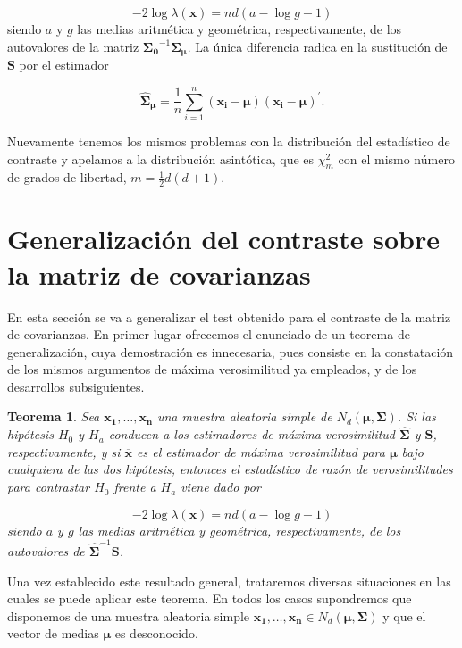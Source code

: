 \documentclass[
  a4paper,
  oneside]{scrbook}
\newtheorem{theorem}{Teorema}[chapter]
\theoremstyle{definition}
\theoremstyle{definition}
\theoremstyle{definition}
\theoremstyle{definition}
\theoremstyle{remark}
\begin{document}
\[-2\log \lambda(\bm{x}) = nd \left(a-\log g -1\right)\] siendo \(a\) y
\(g\) las medias aritmética y geométrica, respectivamente, de los
autovalores de la matriz \(\bm{\Sigma_0}^{-1}\hat{\bm\Sigma}_{\bm{\mu}}\).
La única diferencia radica en la sustitución de \(\bm{S}\) por el
estimador

\[\hat{\bm\Sigma}_{\bm{\mu}}=\frac{1}{n}\sum_{i=1}^n \left(\bm{x_i}-\bm{\mu}\right)\left(\bm{x_i}-\bm{\mu}\right)^\prime{}.\]

Nuevamente tenemos los mismos problemas con la distribución del
estadístico de contraste y apelamos a la distribución asintótica, que es
\(\chi_m^2\) con el mismo número de grados de libertad,
\(m=\frac{1}{2}d(d+1)\).

\section{Generalización del contraste sobre la matriz de covarianzas}\label{generalizacion-del-contraste-sobre-la-matriz-de-covarianzas}

En esta sección se va a generalizar el test obtenido para el
contraste de la matriz de covarianzas. En primer lugar ofrecemos el
enunciado de un teorema de generalización, cuya demostración es
innecesaria, pues consiste en la constatación de los mismos argumentos
de máxima verosimilitud ya empleados, y de los desarrollos
subsiguientes.

\begin{theorem}
\protect\hypertarget{thm:unnamed-chunk-29}{}\label{thm:unnamed-chunk-29}Sea \(\bm{x_1},\ldots,\bm{x_n}\) una muestra aleatoria simple de
\(N_d(\bm{\mu},\bm\Sigma)\). Si las hipótesis \(H_0\) y \(H_a\) conducen a los
estimadores de máxima verosimilitud \(\hat{\bm\Sigma}\) y \(\bm{S}\),
respectivamente, y si \(\overline{\bm{x}}\) es el estimador de máxima
verosimilitud para \(\bm{\mu}\) bajo cualquiera de las dos hipótesis,
entonces el estadístico de razón de verosimilitudes para contrastar
\(H_0\) frente a \(H_a\) viene dado por

\[-2\log\lambda(\bm{x})=nd \left(a-\log g -1\right)\] siendo \(a\) y \(g\)
las medias aritmética y geométrica, respectivamente, de los autovalores
de \(\hat{\bm\Sigma}^{-1}\bm{S}\).
\end{theorem}

Una vez establecido este resultado general, trataremos diversas
situaciones en las cuales se puede aplicar este teorema. En todos los
casos supondremos que disponemos de una muestra aleatoria simple
\(\bm{x_1},\ldots,\bm{x_n}\in N_d(\bm{\mu},\bm\Sigma)\) y que el vector de
medias \(\bm{\mu}\) es desconocido.
\end{document}
